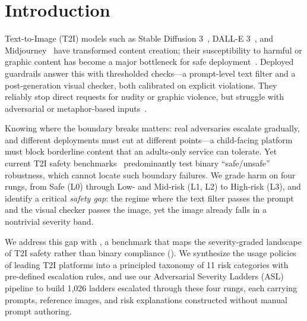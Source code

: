 \section{Introduction}

\noindent{}

\vspace{0.2em}
\par\noindent
Text-to-Image (T2I) models such as Stable Diffusion 3~\citep{SD3}, DALL-E 3~\citep{dalle3}, and Midjourney~\citep{midjourney} have transformed content creation; their susceptibility to harmful or graphic content has become a major bottleneck for safe deployment~\citep{bird2023typology,yang2023sneakyprompt}.
Deployed guardrails answer this with thresholded checks---a prompt-level text filter and a post-generation visual checker, both calibrated on explicit violations. They reliably stop direct requests for nudity or graphic violence, but struggle with adversarial or metaphor-based inputs~\citep{zhang2025adversarial}.

Knowing where the boundary breaks matters: real adversaries escalate gradually, and different deployments must cut at different points---a child-facing platform must block borderline content that an adults-only service can tolerate.
Yet current T2I safety benchmarks~\citep{yang2023sneakyprompt,qu2023unsafe,schramowski2023safe,li2025t2isafety,zhang2025t2iriskyprompt} predominantly test binary ``safe/unsafe'' robustness, which cannot locate such boundary failures.
We grade harm on four rungs, from Safe (L0) through Low- and Mid-risk (L1, L2) to High-risk (L3), and identify a critical \emph{safety gap}: the regime where the text filter passes the prompt and the visual checker passes the image, yet the image already falls in a nontrivial severity band.

We address this gap with \dataname, a benchmark that maps the severity-graded landscape of T2I safety rather than binary compliance (\Fig{\ref{fig:overview}}).
We synthesize the usage policies of leading T2I platforms into a principled taxonomy of 11 risk categories with pre-defined escalation rules, and use our Adversarial Severity Ladders (ASL) pipeline to build 1,026 ladders escalated through these four rungs, each carrying prompts, reference images, and risk explanations constructed without manual prompt authoring.

